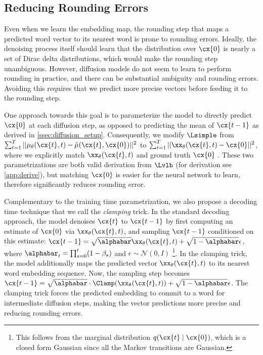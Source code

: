 \subsection{Reducing Rounding Errors}
\label{ssec:rounding}

Even when we learn the embedding map, the rounding step  that maps a predicted word vector to its nearest word is prone to rounding errors.
Ideally, the denoising process itself should learn that the distribution over $\cx{0}$ is nearly a set of Dirac delta distributions, which would make the rounding step unambiguous. However, diffusion models do not seem to learn to perform rounding in practice, and there can be substantial ambiguity and rounding errors. Avoiding this requires that we predict more precise vectors before feeding it to the rounding step. 

One approach towards this goal is to parameterize the model to directly predict $\cx{0}$ at each diffusion step, as opposed to predicting the mean of $\cx{t-1}$ as derived in \cref{ssec:diffusion_setup}.  
Consequently, we modify $\Lsimple$ from $\sum_{t=1}^T || \mu_\theta(\cx{t}, t) - \hat{\mu}(\cx{t}, \cx{0}) ||^2$ to $\sum_{t=1}^T ||\xx_\theta(\cx{t}, t) - \cx{0} ||^2$, where we explicitly match $\xx_\theta(\cx{t}, t)$ and ground truth $\cx{0}$ . 
These two parametrizations are both valid derivation from $\Lvlb$ (for derivation see \cref{app:derive}), but matching $\cx{0}$ is easier for the neural network to learn, therefore significantly reduces rounding error. 

Complementary to the training time parametrization, we also propose a decoding time technique that we call the \emph{clamping} trick. 
In the standard decoding approach, the model denoises $\cx{t}$ to $\cx{t-1}$ by first computing an
estimate of $\cx{0}$ via $\xx_\theta(\cx{t}, t)$, and sampling $\cx{t-1}$ conditioned on this estimate: $\cx{t-1} = \sqrt{\alphabar} \xx_\theta(\cx{t}, t) +\sqrt{1-\alphabar} \epsilon$, where $\alphabar_t = \prod_{s=0}^t (1-\beta_s)$ and $\epsilon \sim \mathcal{N}(0,I)$ \footnote{This follows from the marginal distribution $q(\cx{t} \mid \cx{0})$, which is a closed form Gaussian since all the Markov transitions are Gaussian.}. In the clamping trick, the model additionally maps the predicted vector $\xx_\theta(\cx{t}, t)$ to its nearest word embedding sequence. Now, the sampling step becomes $\cx{t-1} = \sqrt{\alphabar}\cdot \Clamp(\xx_\theta(\cx{t}, t)) +\sqrt{1-\alphabar} \epsilon$. The clamping trick forces the predicted embedding to commit to a word for intermediate diffusion steps, making the vector predictions more precise and reducing rounding errors.  

